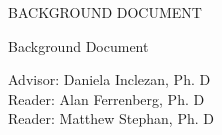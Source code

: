 \documentclass[12pt, oneside]{book2}
\newcommand{\documentTitle}{BACKGROUND DOCUMENT}
\newcommand{\documentSubtitle}{Background Document}
\newcommand{\documentAuthor}{John Meyer}
\newcommand{\documentYear}{2020}
\newcommand{\thesisAdvisor}{Daniela Inclezan, Ph. D}
\newcommand{\thesisFirstReader}{Alan Ferrenberg, Ph. D}
\newcommand{\thesisSecondReader}{Matthew Stephan, Ph. D}
\theoremstyle{definition}
\begin{document}
\begin{titlepage}
\begin{center}

    \documentTitle

    \vspace{1.5cm}

    \documentSubtitle \\


    \vspace{1.5cm}

    Advisor: \thesisAdvisor\\
    Reader: \thesisFirstReader\\
    Reader: \thesisSecondReader\\



\end{center}
\end{titlepage}
\end{document}

